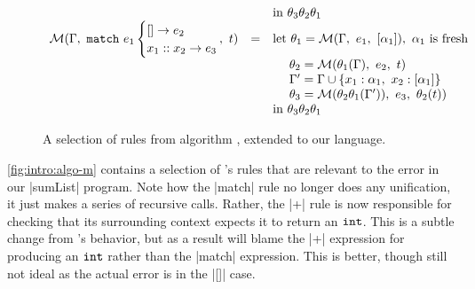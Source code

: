 \begin{figure}
\[{\begin{array}{lcl}
   &   & \text{in } \tsu_3\tsu_2\tsu_1 \\
\M(\Gamma,\ \elcase{e_1}{e_2}{x_1}{x_2}{e_3},\ t)
   & = & \text{let } \tsu_1 = \M(\Gamma,\ e_1,\ \tlist{\alpha_1}),\ \alpha_1 \text{ is fresh} \\
   &   & \quad\ \tsu_2 = \M(\tsu_1(\Gamma),\ e_2,\ t) \\
   &   & \quad\ \Gamma' = \Gamma \cup \{x_1:\alpha_1,\ x_2:\tlist{\alpha_1}\} \\
   &   & \quad\ \tsu_3 = \M(\tsu_2\tsu_1(\Gamma')),\ e_3,\ \tsu_2(t)) \\
   &   & \text{in } \tsu_3\tsu_2\tsu_1 \\
\end{array}
}
\]
\caption{A selection of rules from algorithm \M, extended to our language.}
\label{fig:intro:algo-m}
\end{figure}

\autoref{fig:intro:algo-m} contains a selection of \M's rules that are relevant to the error in our |sumList| program.
%
Note how the |match| rule no longer does any unification, it just makes
a series of recursive calls.
%
Rather, the |+| rule is now responsible for checking that its
surrounding context expects it to return an $\mathtt{int}$.
%
%
This is a subtle change from \W's behavior, but as a result \M will
blame the |+| expression for producing an $\mathtt{int}$ rather than the
|match| expression.
%
This is better, though still not ideal as the actual error is in the
|[]| case.

%

